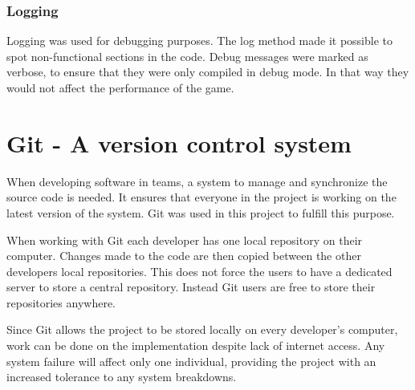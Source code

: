 \subsubsection{Logging}

Logging was used for debugging purposes. The log method made it possible to spot non-functional sections in the code. Debug messages were marked as verbose, to ensure that they were only compiled in debug mode. In that way they would not affect the performance of the game.
\section{Git - A version control system}

When developing software in teams, a system to manage and synchronize the source code is needed. It ensures that everyone in the project is working on the latest version of the system. Git was used in this project to fulfill this purpose.

When working with Git each developer has one local repository on their computer. Changes made to the code are then copied between the other developers local repositories. This does not force the users to have a dedicated server to store a central repository. Instead Git users are free to store their repositories anywhere. \citep{Git} 

Since Git allows the project to be stored locally on every developer's computer, work can be done on the implementation despite lack of internet access. Any system failure will affect only one individual, providing the project with an increased tolerance to any system breakdowns.
